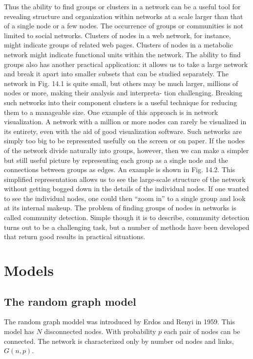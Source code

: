 Thus the ability to find groups or clusters in a network can be a useful tool for revealing structure and organization within networks at a scale larger than that of a single node or a
few nodes. The occurrence of groups or communities is not limited to social networks.
Clusters of nodes in a web network, for instance, might indicate groups of
related web pages. Clusters of nodes in a metabolic network might indicate
functional units within the network. The ability to find groups also has another practical application: it allows
us to take a large network and break it apart into smaller subsets that can be
studied separately. The network in Fig. 14.1 is quite small, but others may be
much larger, millions of nodes or more, making their analysis and interpreta-
tion challenging. Breaking such networks into their component clusters is a
useful technique for reducing them to a manageable size. One example of this
approach is in network visualization. A network with a million or more nodes
can rarely be visualized in its entirety, even with the aid of good visualization
software. Such networks are simply too big to be represented usefully on the
screen or on paper. If the nodes of the network divide naturally into groups,
however, then we can make a simpler but still useful picture by representing
each group as a single node and the connections between groups as edges.
An example is shown in Fig. 14.2. This simplified representation allows us to
see the large-scale structure of the network without getting bogged down in
the details of the individual nodes. If one wanted to see the individual nodes,
one could then “zoom in” to a single group and look at its internal makeup. The problem of finding groups of nodes in networks is called community
detection. Simple though it is to describe, community detection turns out to be
a challenging task, but a number of methods have been developed that return
good results in practical situations.

\section{Models}

\subsection{The random graph model }

The random graph moddel was introduced by Erdos and Renyi in 1959. This model has $N$ disconnected nodes. With probability $p$ each pair of nodes can be connected.  The network is characterized only by number od nodes and links, $G(n, p)$. 


